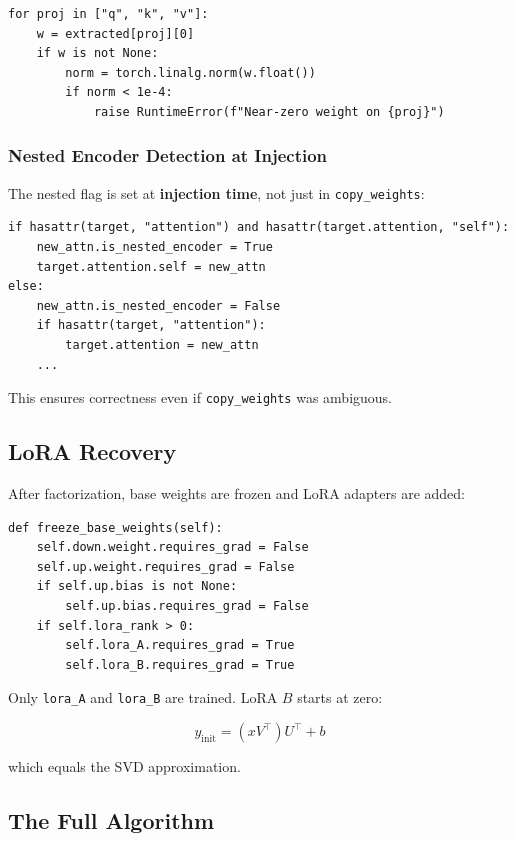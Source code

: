 \begin{lstlisting}
for proj in ["q", "k", "v"]:
    w = extracted[proj][0]
    if w is not None:
        norm = torch.linalg.norm(w.float())
        if norm < 1e-4:
            raise RuntimeError(f"Near-zero weight on {proj}")
\end{lstlisting}

\subsubsection{Nested Encoder Detection at Injection}

The nested flag is set at \textbf{injection time}, not just in \texttt{copy\_weights}:

\begin{lstlisting}
if hasattr(target, "attention") and hasattr(target.attention, "self"):
    new_attn.is_nested_encoder = True
    target.attention.self = new_attn
else:
    new_attn.is_nested_encoder = False
    if hasattr(target, "attention"):
        target.attention = new_attn
    ...
\end{lstlisting}

This ensures correctness even if \texttt{copy\_weights} was ambiguous.

\subsection{LoRA Recovery}

After factorization, base weights are frozen and LoRA adapters are added:

\begin{lstlisting}
def freeze_base_weights(self):
    self.down.weight.requires_grad = False
    self.up.weight.requires_grad = False
    if self.up.bias is not None:
        self.up.bias.requires_grad = False
    if self.lora_rank > 0:
        self.lora_A.requires_grad = True
        self.lora_B.requires_grad = True
\end{lstlisting}

Only \texttt{lora\_A} and \texttt{lora\_B} are trained. LoRA $B$ starts at zero:

\[
y_{\text{init}} = (x V^\top) U^\top + b
\tag{4.8}
\]

which equals the SVD approximation.

\subsection{The Full Algorithm}

